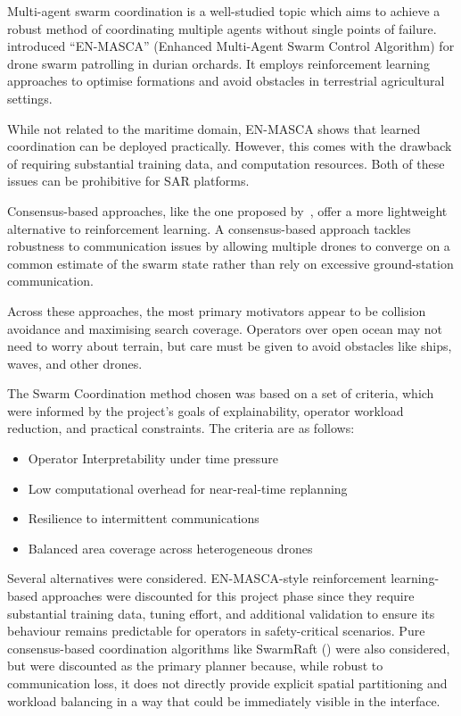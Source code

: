 Multi-agent swarm coordination is a well-studied topic which aims to achieve a robust method of coordinating multiple agents without single points of failure.
\cite{ENMASCA2025} introduced ``EN-MASCA'' (Enhanced Multi-Agent Swarm Control Algorithm) for drone swarm patrolling in durian orchards.
It employs reinforcement learning approaches to optimise formations and avoid obstacles in terrestrial agricultural settings.

While not related to the maritime domain, EN-MASCA shows that learned coordination can be deployed practically.
However, this comes with the drawback of requiring substantial training data, and computation resources.
Both of these issues can be prohibitive for SAR platforms.

Consensus-based approaches, like the one proposed by~\cite{dev2025swarnraft}, offer a more lightweight alternative to reinforcement learning.
A consensus-based approach tackles robustness to communication issues by allowing multiple drones to converge on a common estimate of the swarm state rather than rely on excessive ground-station communication.

Across these approaches, the most primary motivators appear to be collision avoidance and maximising search coverage.
Operators over open ocean may not need to worry about terrain, but care must be given to avoid obstacles like ships, waves, and other drones.

The Swarm Coordination method chosen was based on a set of criteria, which were informed by the project's goals of explainability, operator workload reduction, and practical constraints.
The criteria are as follows:

\begin{itemize}
    \item Operator Interpretability under time pressure
    \item Low computational overhead for near-real-time replanning
    \item Resilience to intermittent communications
    \item Balanced area coverage across heterogeneous drones
\end{itemize}

Several alternatives were considered.
EN-MASCA-style reinforcement learning-based approaches were discounted for this project phase since they require substantial training data, tuning effort, and additional validation to ensure its behaviour remains predictable for operators in safety-critical scenarios.
Pure consensus-based coordination algorithms like SwarmRaft (\cite{Dev_2026}) were also considered, but were discounted as the primary planner because, while robust to communication loss, it does not directly provide explicit spatial partitioning and workload balancing in a way that could be immediately visible in the interface.

